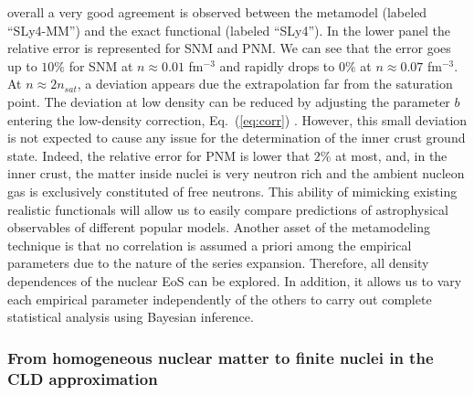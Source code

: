 overall a very good agreement is observed between the metamodel (labeled
``SLy4-MM'') and the exact functional (labeled ``SLy4''). In the lower panel 
the relative error is represented for
SNM and PNM. We can see that the error goes up to $10\%$ for SNM at $n \approx
0.01$ fm$^{-3}$ and rapidly drops to $0\%$ at $n \approx 0.07$
fm$^{-3}$. At $n \approx 2n_{sat}$, a deviation appears due the extrapolation far
from the saturation point. The deviation at low density can be reduced by 
adjusting the parameter $b$ entering the low-density correction,
Eq.~(\ref{eq:corr}) \cite{Antic2019}. However,
this small deviation is not expected to cause any issue for the determination
of the inner crust ground state. Indeed, the relative error for PNM is lower 
that $2\%$ at most, and, in the inner crust, the matter inside nuclei is very 
neutron rich and the ambient nucleon gas is exclusively constituted of free
neutrons. {This ability of mimicking existing realistic functionals will 
  allow us to easily compare predictions of astrophysical observables of 
different popular models.} 
Another asset of the metamodeling technique is that no correlation is assumed
a priori among the empirical parameters due to the nature of the
series expansion. Therefore, all density dependences of the
nuclear EoS can be explored. In addition, it allows us to vary each empirical 
parameter independently of the others to carry out complete statistical 
analysis using Bayesian inference. 

\subsubsection{From homogeneous nuclear matter to finite nuclei in the CLD 
approximation}\label{subsubsec:cld}

